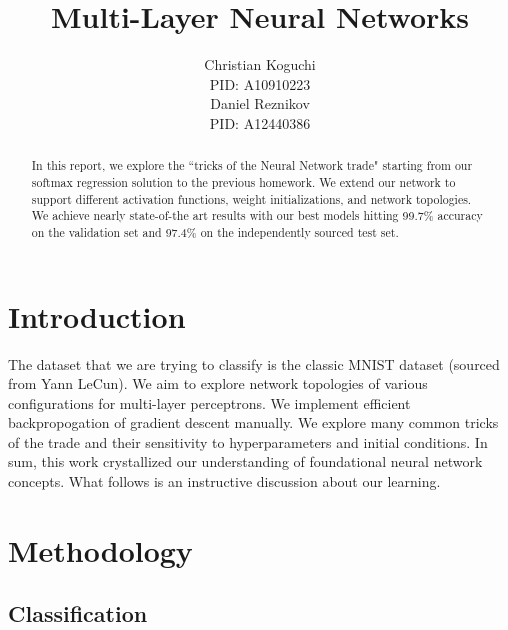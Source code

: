 \documentclass{article} %
\title{Multi-Layer Neural Networks}
\author{
Christian Koguchi \\
PID: A10910223 \\
\And
Daniel Reznikov \\
PID: A12440386 \\
}
\begin{document}
\maketitle


\begin{abstract}
In this report, we explore the ``tricks of the Neural Network trade" starting from our softmax regression solution to the previous homework.  We extend our network to support different activation functions, weight initializations, and network topologies.  We achieve nearly state-of-the art results with our best models hitting 99.7\% accuracy on the validation set and 97.4\% on the independently sourced test set.   
\end{abstract}




\section*{Introduction}
The dataset that we are trying to classify is the classic MNIST dataset (sourced from Yann LeCun)\cite{Lecun}.  We aim to explore network topologies of various configurations for multi-layer perceptrons.  We implement efficient backpropogation of gradient descent manually.  We explore many common tricks of the trade and their sensitivity to hyperparameters and initial conditions.  In sum, this work crystallized our understanding of foundational neural network concepts.  What follows is an instructive discussion about our learning.  


\section*{Methodology}
\subsection*{Classification}
\end{document}
